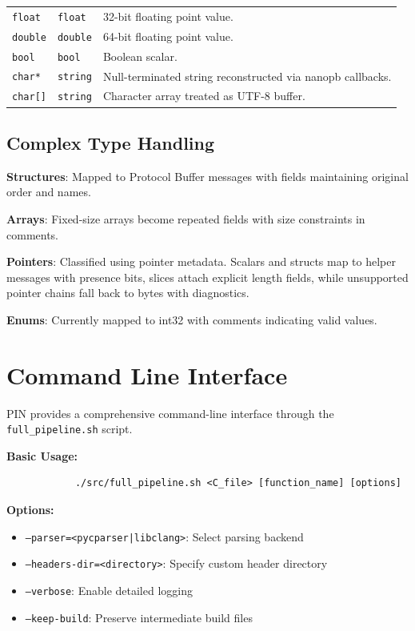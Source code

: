 \documentclass[doublespace,nopageskip]{VTthesis} %
\begin{document}
\begin{appendices}
\begin{table}[htb]
\begin{tabular}{p{2.5cm}p{3cm}p{7cm}}
					\texttt{float} & \texttt{float} & 32-bit floating point value. \\
					\texttt{double} & \texttt{double} & 64-bit floating point value. \\
					\texttt{bool} & \texttt{bool} & Boolean scalar. \\
					\texttt{char*} & \texttt{string} & Null-terminated string reconstructed via nanopb callbacks. \\
					\texttt{char[]} & \texttt{string} & Character array treated as UTF-8 buffer. \\
					\bottomrule
				\end{tabular}
				\label{tab:complete_type_mapping}
			\end{table}
			
			\subsection{Complex Type Handling}
			\textbf{Structures}: Mapped to Protocol Buffer messages with fields maintaining original order and names.
			
			\textbf{Arrays}: Fixed-size arrays become repeated fields with size constraints in comments.
			
\textbf{Pointers}: Classified using pointer metadata. Scalars and structs map to helper messages with presence bits, slices attach explicit length fields, while unsupported pointer chains fall back to bytes with diagnostics.
			
			\textbf{Enums}: Currently mapped to int32 with comments indicating valid values.
			
			\section{Command Line Interface} \label{ase:cli_interface}
			PIN provides a comprehensive command-line interface through the \texttt{full\_pipeline.sh} script.
			
			\textbf{Basic Usage:}
			\begin{verbatim}
			./src/full_pipeline.sh <C_file> [function_name] [options]
			\end{verbatim}
			
			\textbf{Options:}
			\begin{itemize}
				\item \texttt{--parser=<pycparser|libclang>}: Select parsing backend
				\item \texttt{--headers-dir=<directory>}: Specify custom header directory
				\item \texttt{--verbose}: Enable detailed logging
				\item \texttt{--keep-build}: Preserve intermediate build files
			\end{itemize}
			

\end{appendices}
\end{document}

